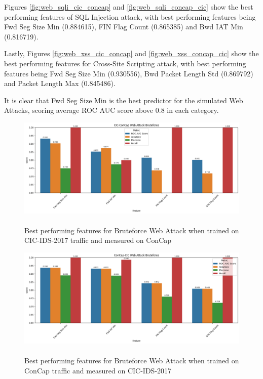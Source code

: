 Figures \ref{fig:web_sqli_cic_concap} and \ref{fig:web_sqli_concap_cic} show the best performing features of SQL Injection attack, with best performing features being Fwd Seg Size Min (0.884615), FIN Flag Count (0.865385) and Bwd IAT Min (0.816719). 

Lastly, Figures \ref{fig:web_xss_cic_concap} and \ref{fig:web_xss_concap_cic} show the best performing features for Cross-Site Scripting attack, with best performing features being Fwd Seg Size Min (0.930556), Bwd Packet Length Std (0.869792) and Packet Length Max (0.845486).

It is clear that Fwd Seg Size Min is the best predictor for the simulated Web Attacks, scoring average ROC AUC score above 0.8 in each category. 

\begin{figure}
	\centering
	\includegraphics[width=1.2\linewidth]{images/web_bruteforce_cic_concap}
	\caption{\\Best performing features for Bruteforce Web Attack when trained on CIC-IDS-2017 traffic and measured on ConCap}
	\label{fig:web_bruteforce_cic_concap}
\end{figure}
\begin{figure}
	\centering
	\includegraphics[width=1.2\linewidth]{images/web_bruteforce_concap_cic}
	\caption{\\Best performing features for Bruteforce Web Attack when trained on ConCap traffic and measured on CIC-IDS-2017}
	\label{fig:web_bruteforce_concap_cic}
\end{figure}

